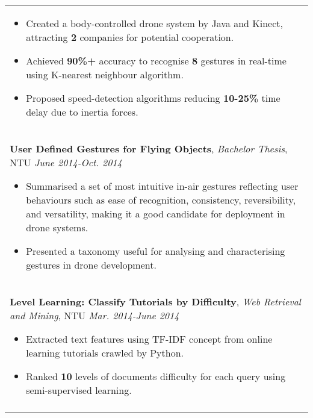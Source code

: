 \documentclass[a4paper,10pt]{article} %
\begin{document}
{\begin{tabular}{p{16cm}}
\vspace{0.5mm}
\begin{itemize}
\item Created a body-controlled drone system by Java and Kinect, attracting \textbf{2} companies for potential cooperation. 
\item Achieved \textbf{90\%+} accuracy to recognise \textbf{8} gestures in real-time using K-nearest neighbour algorithm.
\item Proposed speed-detection algorithms reducing \textbf{10-25\%} time delay due to inertia forces. \vspace*{-\baselineskip}
\end{itemize} \\
\vspace{0.5mm}

\normalsize\textbf{User Defined Gestures for Flying Objects}, {\it{Bachelor Thesis}}, NTU \hfill {\it June 2014-Oct. 2014}
\vspace{0.5mm}
\begin{itemize}
\item Summarised a set of most intuitive in-air gestures reflecting user behaviours such as ease of recognition, consistency, reversibility, and versatility, making it a good candidate for deployment in drone systems.
\item Presented a taxonomy useful for analysing and characterising gestures in drone development.\vspace*{-\baselineskip} 
\end{itemize} \\
\vspace{0.5mm}

\normalsize\textbf{Level Learning: Classify Tutorials by Difficulty}, {\it{Web Retrieval and Mining}}, NTU \hfill {\it Mar. 2014-June 2014}
\vspace{0.5mm}
\begin{itemize}
\item Extracted text features using TF-IDF concept from online learning tutorials crawled by Python.
\item Ranked \textbf{10} levels of documents difficulty for each query using semi-supervised learning.\vspace*{-\baselineskip}
\end{itemize}\\
\vspace{0.5mm}


\end{tabular}}
\end{document}
